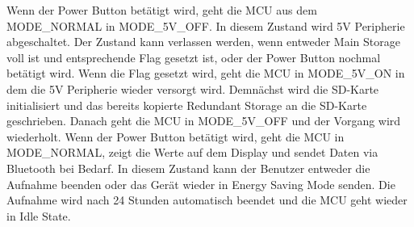 Wenn der Power Button betätigt wird, geht die MCU aus dem MODE\_NORMAL in MODE\_5V\_OFF. In diesem Zustand wird 5V Peripherie abgeschaltet. Der Zustand kann verlassen werden, wenn entweder Main Storage voll ist und entsprechende Flag gesetzt ist, oder der Power Button nochmal betätigt wird.
Wenn die Flag gesetzt wird, geht die MCU in MODE\_5V\_ON in dem die 5V Peripherie wieder versorgt wird. Demnächst wird die SD-Karte initialisiert und das bereits kopierte Redundant Storage an die SD-Karte geschrieben. Danach geht die MCU in MODE\_5V\_OFF und der Vorgang wird wiederholt.
Wenn der Power Button betätigt wird, geht die MCU in MODE\_NORMAL, zeigt die Werte auf dem Display und sendet Daten via Bluetooth bei Bedarf. In diesem Zustand kann der Benutzer entweder die Aufnahme beenden oder das Gerät wieder in Energy Saving Mode senden. 
Die Aufnahme wird nach 24 Stunden automatisch beendet und die MCU geht wieder in Idle State.

